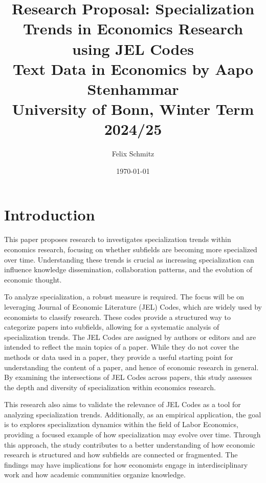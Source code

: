 \documentclass[11pt, a4paper, leqno]{article}
\begin{document}
\title{Research Proposal: Specialization Trends in Economics Research using JEL Codes \\
Text Data in Economics by Aapo Stenhammar \\
University of Bonn, Winter Term 2024/25}

\author{Felix Schmitz\footnotemark[1]}

\date{
    \today
}

\maketitle
{}

\clearpage

\section{Introduction}
This paper proposes research to investigates specialization trends within economics research, focusing on whether subfields are becoming more specialized over time.
Understanding these trends is crucial as increasing specialization can influence knowledge dissemination, collaboration patterns, and the evolution of economic thought.

To analyze specialization, a robust measure is required.
The focus will be on leveraging Journal of Economic Literature (JEL) Codes, which are widely used by economists to classify research.
These codes provide a structured way to categorize papers into subfields, allowing for a systematic analysis of specialization trends.
The JEL Codes are assigned by authors or editors and are intended to reflect the main topics of a paper.
While they do not cover the methods or data used in a paper, they provide a useful starting point for understanding the content of a paper, and hence of economic research in general.
By examining the intersections of JEL Codes across papers, this study assesses the depth and diversity of specialization within economics research.

This research also aims to validate the relevance of JEL Codes as a tool for analyzing specialization trends.
Additionally, as an empirical application, the goal is to explores specialization dynamics within the field of Labor Economics, providing a focused example of how specialization may evolve over time.
Through this approach, the study contributes to a better understanding of how economic research is structured and how subfields are connected or fragmented.
The findings may have implications for how economists engage in interdisciplinary work and how academic communities organize knowledge.
\end{document}

